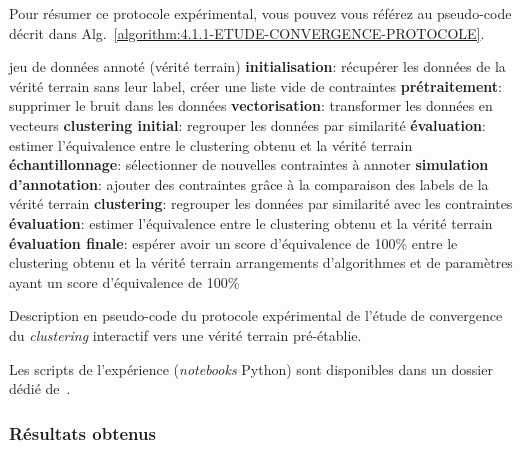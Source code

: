 			Pour résumer ce protocole expérimental, vous pouvez vous référez au pseudo-code décrit dans Alg.~\ref{algorithm:4.1.1-ETUDE-CONVERGENCE-PROTOCOLE}.
			\begin{algorithm}[!htb]
				\begin{algorithmic}[1]
					\Require jeu de données annoté (vérité terrain)
						\State \textbf{initialisation}: récupérer les données de la vérité terrain sans leur label, créer une liste vide de contraintes
						\State \textbf{prétraitement}: supprimer le bruit dans les données
						\State \textbf{vectorisation}: transformer les données en vecteurs
						\State \textbf{clustering initial}: regrouper les données par similarité
						\State \textbf{évaluation}: estimer l'équivalence entre le clustering obtenu et la vérité terrain
						\Repeat
							\State \textbf{échantillonnage}: sélectionner de nouvelles contraintes à annoter
							\State \textbf{simulation d'annotation}: ajouter des contraintes grâce à la comparaison des labels de la vérité terrain
							\State \textbf{clustering}: regrouper les données par similarité avec les contraintes
							\State \textbf{évaluation}: estimer l'équivalence entre le clustering obtenu et la vérité terrain
						\State \textbf{évaluation finale}: espérer avoir un score d'équivalence de 100\% entre le clustering obtenu et la vérité terrain
					\EndFor
					\Ensure arrangements d'algorithmes et de paramètres ayant un score d'équivalence de 100\%
				\end{algorithmic}
				\caption{Description en pseudo-code du protocole expérimental de l'étude de convergence du \textit{clustering} interactif vers une vérité terrain pré-établie.}
				\label{algorithm:4.1.1-ETUDE-CONVERGENCE-PROTOCOLE}
			\end{algorithm}
			
			\begin{leftBarInformation}
				Les scripts de l'expérience (\textit{notebooks} Python) sont disponibles dans un dossier dédié de~\cite{schild:cognitivefactory-interactive-clustering-comparative-study:2021}.
			\end{leftBarInformation}

		\subsubsection{Résultats obtenus}
			
